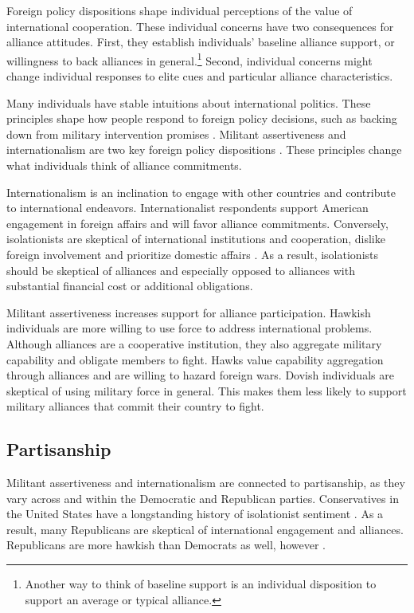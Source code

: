 \documentclass[12pt]{article}
\begin{document}
Foreign policy dispositions shape individual perceptions of the value of international cooperation. 
These individual concerns have two consequences for alliance attitudes. 
First, they establish individuals' baseline alliance support, or willingness to back alliances in general.\footnote{Another way to think of baseline support is an individual disposition to support an average or typical alliance.} 
Second, individual concerns might change individual responses to elite cues and particular alliance characteristics. 


Many individuals have stable intuitions about international politics. 
These principles shape how people respond to foreign policy decisions, such as backing down from military intervention promises \citep{KertzerBrutger2016}. 
Militant assertiveness and internationalism are two key foreign policy dispositions \citep{Herrmannetal1999}.  
These principles change what individuals think of alliance commitments. 


Internationalism is an inclination to engage with other countries and contribute to international endeavors. 
Internationalist respondents support American engagement in foreign affairs and will favor alliance commitments. 
Conversely, isolationists are skeptical of international institutions and cooperation, dislike foreign involvement and prioritize domestic affairs \citep{Kertzer2013}. 
As a result, isolationists should be skeptical of alliances and especially opposed to alliances with substantial financial cost or additional obligations. 


Militant assertiveness increases support for alliance participation. 
Hawkish individuals are more willing to use force to address international problems. 
Although alliances are a cooperative institution, they also aggregate military capability \citep{FordhamPoast2014} and obligate members to fight.
Hawks value capability aggregation through alliances and are willing to hazard foreign wars.  
Dovish individuals are skeptical of using military force in general.
This makes them less likely to support military alliances that commit their country to fight.  


\subsection{Partisanship}

Militant assertiveness and internationalism are connected to partisanship, as they vary across and within the Democratic and Republican parties. 
Conservatives in the United States have a longstanding history of isolationist sentiment \citep{Kupchan2020}.
As a result, many Republicans are skeptical of international engagement and alliances. 
Republicans are more hawkish than Democrats as well, however \citep{Gries2014}. 
\end{document}
